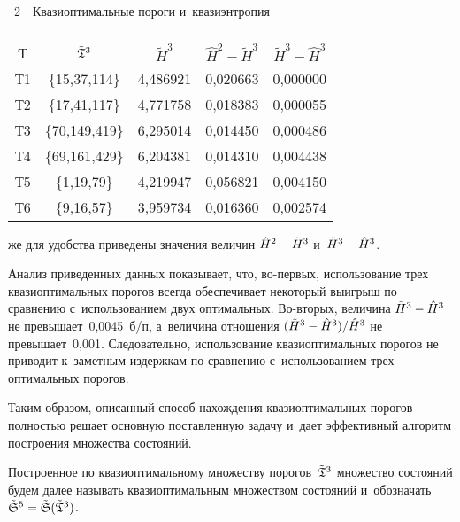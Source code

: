 \begin{multicols}{2}
\pagebreak



{\small \begin{center}  %
 \noindent
{{\tablename~2}\ \ \small{Квазиоптимальные пороги и~квазиэнтропия}}
\vspace*{2ex}


\begin{tabular}{|c|c|c|c|c|}
\hline
&&&&\\[-9pt]
 T & ${\tilde{\frak T}}^3$ & $\tilde{H}^3$ & 
$\hat{H}^2-\tilde{H}^3$ & $\tilde{H}^3-\hat{H}^3$ \\
\hline
Т1 & \{15,37,114\} & 4,486921 & 0,020663 & 0,000000 \\
Т2 & \{17,41,117\} & 4,771758 & 0,018383 & 0,000055 \\
Т3 & \{70,149,419\} & 6,295014 & 0,014450 & 0,000486 \\
Т4 & \{69,161,429\} & 6,204381 & 0,014310 & 0,004438 \\
Т5 & \{1,19,79\} & 4,219947 & 0,056821 & 0,004150 \\
Т6 & \{9,16,57\} & 3,959734 & 0,016360 & 0,002574 \\
\hline
\end{tabular}
\end{center}
\vspace*{12pt}
}

\addtocounter{table}{1}

\noindent
же для удобства 
приведены значения величин $\hat{H}^2\hm-\tilde{H}^3$ и~$\tilde{H}^3\hm-\hat{H}^3$.

Анализ приведенных данных показывает, что, во-пер\-вых, 
использование трех квазиоптимальных 
 порогов всегда обеспечивает некоторый выигрыш 
по сравнению с~использованием двух оптимальных. Во-вто\-рых, 
величина $\tilde{H}^3\hm-\hat{H}^3$  не превышает~0,0045~б/п, 
а~величина отношения $(\tilde{H}^3\hm-\hat{H}^3)/\hat{H}^3$ не превышает~0,001. 
Следовательно, использование квазиоптимальных порогов не приводит к~заметным 
издержкам по сравнению с~использованием трех оптимальных порогов. 

Таким образом, описанный способ нахождения квазиоптимальных порогов 
полностью решает основную поставленную задачу и~дает эффективный алгоритм 
построения множества состояний.

Построенное по квазиоптимальному множеству порогов~$\tilde{\frak T}^3$ множество 
состояний будем далее называть квазиоптимальным множеством 
состояний и~обозначать $\tilde{\frak S}^5\hm=\tilde{\frak S}(\tilde{\frak T}^3)$.


\end{multicols}
